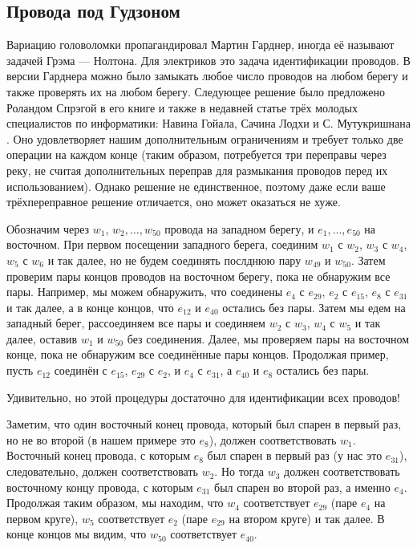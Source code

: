 \subsection*{Провода под Гудзоном}

Вариацию головоломки пропагандировал Мартин Гарднер, иногда её называют задачей Грэма --- Нолтона.
Для электриков это задача идентификации проводов.
В версии Гарднера можно было замыкать любое число проводов на любом берегу и также проверять их на любом берегу.
Следующее решение было предложено Роландом Спрэгой в его книге \cite{sprague} и также в недавней статье трёх молодых специалистов по информатики: Навина Гойала, Сачина Лодхи и С. Мутукришнана \cite{goyal-lodha-muthukrishnan}.
Оно удовлетворяет нашим дополнительным ограничениям и требует только две операции на каждом конце (таким образом, потребуется три переправы через реку, не считая дополнительных переправ для размыкания проводов перед их использованием).
Однако решение не единственное, поэтому даже если ваше трёхпереправное решение отличается, оно может оказаться не хуже.

Обозначим через $w_1$, $w_2, \dots, w_{50}$ провода на западном берегу,
и $e_1, \dots, e_{50}$ на восточном. %
При первом посещении западного берега, соединим $w_1$ с $w_2$, $w_3$ с $w_4$, $w_5$ с $w_6$ и так далее, но не будем соединять послднюю пару $w_{49}$ и $w_{50}$.
Затем проверим пары концов проводов на восточном берегу, пока не обнаружим все пары.
Например, мы можем обнаружить, что соединены $e_4$ с $e_{29}$, $e_2$ с $e_{15}$, $e_8$ с $e_{31}$ и так далее, а в конце концов, что $e_{12}$ и $e_{40}$ остались без пары.
Затем мы едем на западный берег, рассоединяем все пары и соединяем $w_2$ с $w_3$, $w_4$ с $w_5$ и так далее, оставив $w_1$ и $w_{50}$ без соединения.
Далее, мы проверяем пары на восточном конце, пока не обнаружим все соединённые пары концов.
Продолжая пример, пусть $e_{12}$ соединён с $e_{15}$, $e_{29}$ с $e_2$, и $e_4$ с $e_{31}$, а $e_{40}$ и $e_8$ остались без пары.

Удивительно, но этой процедуры достаточно для идентификации всех проводов!

Заметим, что один восточный конец провода, который был спарен в первый раз, но не во второй (в нашем примере это $e_8$), должен соответствовать $w_1$.
Восточный конец провода, с которым $e_8$ был спарен в первый раз (у нас это $e_{31}$), следовательно, должен соответствовать $w_2$.
Но тогда $w_3$ должен соответствовать восточному концу провода, с которым $e_{31}$ был спарен во второй раз, а именно $e_4$.
Продолжая таким образом, мы находим, что $w_4$ соответствует $e_{29}$ (паре $e_4$ на первом круге), $w_5$ соответствует $e_2$ (паре $e_{29}$ на втором круге) и так далее.
В конце концов мы видим, что $w_{50}$ соответствует $e_{40}$.

